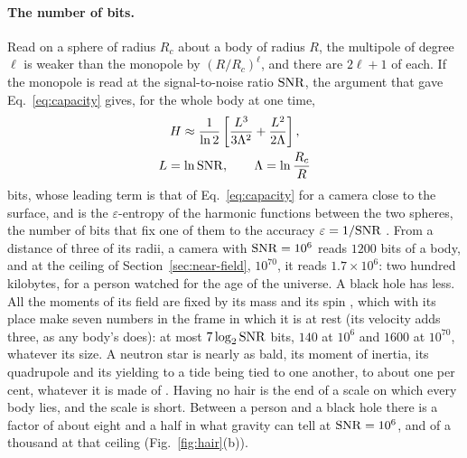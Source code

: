 \paragraph{The number of bits.} Read on a sphere of radius $R_c$ about a
body of radius $R$, the multipole of degree $\ell$ is weaker than the monopole
by $(R/R_c)^\ell$, and there are $2\ell + 1$ of each. If the monopole is read at
the signal-to-noise ratio $\mathrm{SNR}$, the argument that gave
Eq.~\eqref{eq:capacity} gives, for the whole body at one time,
\begin{equation}\label{eq:hair-bits}
\begin{gathered}
H \approx \frac{1}{\ln 2}\left[\frac{L^3}{3\Lambda^2} + \frac{L^2}{2\Lambda}\right],\\
L = \ln\mathrm{SNR}, \qquad \Lambda = \ln\frac{R_c}{R}
\end{gathered}
\end{equation}
bits, whose leading term is that of Eq.~\eqref{eq:capacity} for a camera close
to the surface, and is the $\varepsilon$-entropy of the harmonic functions
between the two spheres, the number of bits that fix one of them to the
accuracy $\varepsilon = 1/\mathrm{SNR}$ \cite{KolmogorovTikhomirov1959,SkibaZahariuta2000}. From a distance of three of its radii, a camera with $\mathrm{SNR} = 10^6$ reads
$1200$ bits of a body, and at the ceiling of
Section~\ref{sec:near-field}, $10^{70}$, it reads $1.7\times10^6$: two hundred
kilobytes, for a person watched for the age of the universe. A black hole has
less. All the moments of its field are fixed by its mass and its spin
\cite{Hansen1974}, which with its place make seven numbers in the frame in
which it is at rest (its velocity adds three, as any body's does): at most
$7\log_2\mathrm{SNR}$ bits, $140$ at $10^6$ and $1600$ at $10^{70}$, whatever its
size. A neutron star is nearly as bald, its moment of inertia, its quadrupole
and its yielding to a tide being tied to one another, to about one per cent,
whatever it is made of \cite{YagiYunes2013}. Having no hair is the end of a scale on which every body
lies, and the scale is short. Between a person and a black hole there is a
factor of about eight and a half in what gravity can tell at $\mathrm{SNR} = 10^6$, and of a thousand at
that ceiling (Fig.~\ref{fig:hair}(b)).

